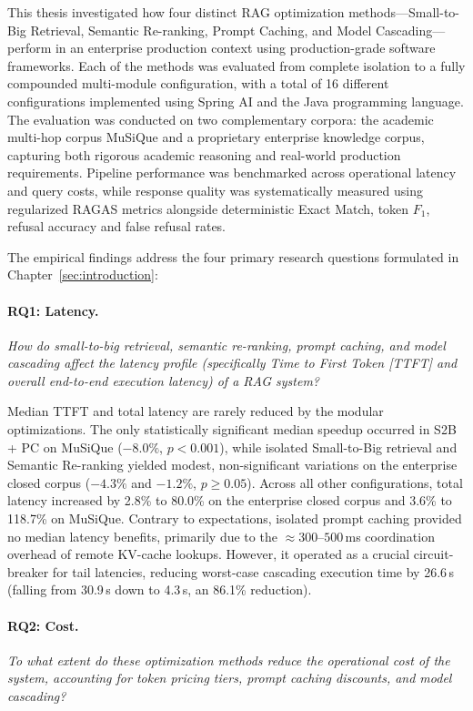This thesis investigated how four distinct RAG optimization methods---Small-to-Big Retrieval, Semantic Re-ranking, Prompt Caching, and Model Cascading---perform in an enterprise production context using production-grade software frameworks. Each of the methods was evaluated from complete isolation to a fully compounded multi-module configuration, with a total of 16 different configurations implemented using Spring AI and the Java programming language. The evaluation was conducted on two complementary corpora: the academic multi-hop corpus MuSiQue and a proprietary enterprise knowledge corpus, capturing both rigorous academic reasoning and real-world production requirements. Pipeline performance was benchmarked across operational latency and query costs, while response quality was systematically measured using regularized RAGAS metrics alongside deterministic Exact Match, token $F_1$, refusal accuracy and false refusal rates. 

The empirical findings address the four primary research questions formulated in Chapter~\ref{sec:introduction}:

\paragraph{RQ1: Latency.} \textit{How do small-to-big retrieval, semantic re-ranking, prompt caching, and model cascading affect the latency profile (specifically Time to First Token [TTFT] and overall end-to-end execution latency) of a RAG system?}

Median TTFT and total latency are rarely reduced by the modular optimizations. The only statistically significant median speedup occurred in S2B + PC on MuSiQue ($-8.0\%$, $p < 0.001$), while isolated Small-to-Big retrieval and Semantic Re-ranking yielded modest, non-significant variations on the enterprise closed corpus ($-4.3\%$ and $-1.2\%$, $p \ge 0.05$). Across all other configurations, total latency increased by 2.8\% to 80.0\% on the enterprise closed corpus and 3.6\% to 118.7\% on MuSiQue. Contrary to expectations, isolated prompt caching provided no median latency benefits, primarily due to the $\approx 300\text{--}500$\,ms coordination overhead of remote KV-cache lookups. However, it operated as a crucial circuit-breaker for tail latencies, reducing worst-case cascading execution time by 26.6\,s (falling from 30.9\,s down to 4.3\,s, an 86.1\% reduction).

\paragraph{RQ2: Cost.} \textit{To what extent do these optimization methods reduce the operational cost of the system, accounting for token pricing tiers, prompt caching discounts, and model cascading?}

